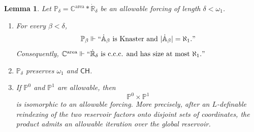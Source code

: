 \documentclass[a4paper,11pt]{article}
\newtheorem{lemma}[theorem]{Lemma}
\newcommand{\forceP}{\mathbb{P}}
\newcommand{\forceR}{\mathbb{R}}
\newcommand{\forceA}{\mathbb{A}}
\newcommand{\forceC}{\mathbb{C}}
\newcommand{\CH}{\mathsf{CH}}
\begin{document}
\begin{lemma}
\label{basic-properties-allowable-forcings}
Let $\forceP_\delta=\forceC^{\mathrm{area}}*\dot{\forceR}_\delta$ be an
allowable forcing of length $\delta<\omega_1$.
\begin{enumerate}
   \item For every $\beta<\delta$,
   \[
      \forceP_\beta\Vdash
      ``\dot{\forceA}_\beta\text{ is Knaster and }
      |\dot{\forceA}_\beta|=\aleph_1."
   \]
   Consequently,
   $\forceC^{\mathrm{area}}\Vdash
   ``\dot{\forceR}_\delta\text{ is c.c.c. and has size at most }
   \aleph_1."$

   \item $\forceP_\delta$ preserves $\omega_1$ and $\CH$.

   \item If $\forceP^0$ and $\forceP^1$ are allowable, then
   \[
      \forceP^0\times\forceP^1
   \]
   is isomorphic to an allowable forcing.  More precisely, after an
   $L$-definable reindexing of the two reservoir factors onto disjoint
   sets of coordinates, the product admits an allowable iteration over the
   global reservoir.
\end{enumerate}
\end{lemma}
\end{document}

